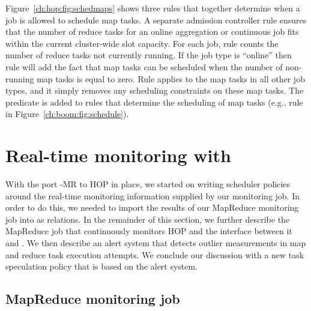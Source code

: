 Figure~\ref{ch:hop:fig:schedmaps} shows three rules that together determine
when a job is allowed to schedule map tasks.  A separate admission controller
rule ensures that the number of reduce tasks for an online aggregation or
continuous job fits within the current cluster-wide slot capacity.  For each
job, rule  counts the number of reduce tasks not currently running.  If
the job type is ``online'' then rule  will add the fact that map tasks
can be scheduled when the number of non-running map tasks is equal to zero.
Rule  applies to the map tasks in all other job types, and it simply
removes any scheduling constraints on these map tasks.  The
 predicate is added to rules that determine the scheduling
of map tasks (e.g., rule  in Figure~\ref{ch:boom:fig:schedule}).

\section{Real-time monitoring with \JOL}
\label{ch:hop:sec:jolmonitor}

With the port \BOOM-MR to HOP in place, we started on writing scheduler
policies around the real-time monitoring information supplied by our monitoring
job.  In order to do this, we needed to import the results of our MapReduce
monitoring job into \JOL as relations.  In the remainder of this section, we
further describe the MapReduce job that continuously monitors HOP and the
interface between it and \JOL.  We then describe an alert system that detects
outlier measurements in map and reduce task execution attempts.  We conclude
our discussion with a new task speculation policy that is based on the alert
system.

\subsection{MapReduce monitoring job}


